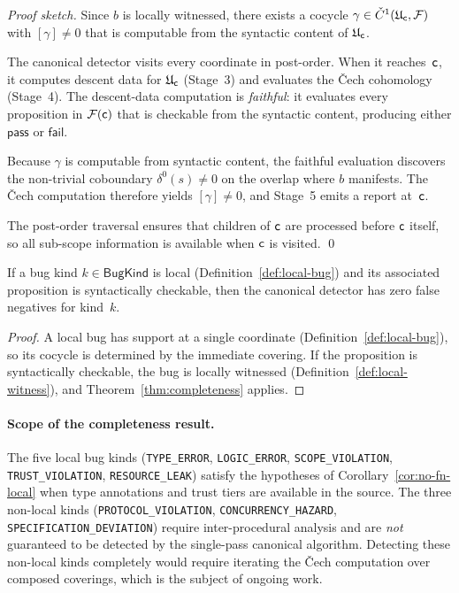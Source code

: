 \documentclass[11pt]{article}
\newcommand{\BugKind}{\ensuremath{\mathsf{BugKind}}}          %
\begin{document}
\begin{proof}[Proof sketch]
Since $b$ is locally witnessed, there exists a cocycle
$\gamma \in \check{C}^1(\mathfrak{U}_{\mathsf{c}}, \mathcal{F})$ with
$[\gamma] \neq 0$ that is computable from the syntactic content
of $\mathfrak{U}_{\mathsf{c}}$.

The canonical detector visits every coordinate in post-order.
When it reaches~$\mathsf{c}$, it computes descent data for
$\mathfrak{U}_{\mathsf{c}}$ (Stage~3) and evaluates the \v{C}ech
cohomology (Stage~4).  The descent-data computation is
\emph{faithful}: it evaluates every proposition in
$\mathcal{F}(\mathsf{c})$ that is checkable from the syntactic content,
producing either $\mathsf{pass}$ or $\mathsf{fail}$.

Because $\gamma$ is computable from syntactic content, the
faithful evaluation discovers the non-trivial coboundary
$\delta^0(s) \neq 0$ on the overlap where $b$ manifests.  The
\v{C}ech computation therefore yields $[\gamma] \neq 0$, and
Stage~5 emits a report at~$\mathsf{c}$.

The post-order traversal ensures that children of $\mathsf{c}$ are
processed before $\mathsf{c}$ itself, so all sub-scope information
is available when $\mathsf{c}$ is visited.  \qed
\end{proof}

\begin{corollary}\label{cor:no-fn-local}
If a bug kind $k \in \BugKind$ is local
(Definition~\ref{def:local-bug}) and its associated proposition is
syntactically checkable, then the canonical detector has zero false
negatives for kind~$k$.
\end{corollary}

\begin{proof}
A local bug has support at a single coordinate
(Definition~\ref{def:local-bug}), so its cocycle is determined by
the immediate covering.  If the proposition is syntactically
checkable, the bug is locally witnessed
(Definition~\ref{def:local-witness}), and
Theorem~\ref{thm:completeness} applies.
\end{proof}

\paragraph{Scope of the completeness result.}
The five local bug kinds
(\texttt{TYPE\_ERROR}, \texttt{LOGIC\_ERROR},
\texttt{SCOPE\_VIOLATION}, \texttt{TRUST\_VIOLATION},
\texttt{RESOURCE\_LEAK}) satisfy the hypotheses of
Corollary~\ref{cor:no-fn-local} when type annotations and trust
tiers are available in the source.  The three non-local kinds
(\texttt{PROTOCOL\_VIOLATION}, \texttt{CONCURRENCY\_HAZARD},
\texttt{SPECIFICATION\_DEVIATION}) require inter-procedural analysis
and are \emph{not} guaranteed to be detected by the single-pass
canonical algorithm.  Detecting these non-local kinds completely would
require iterating the \v{C}ech computation over composed coverings,
which is the subject of ongoing work.
\end{document}
